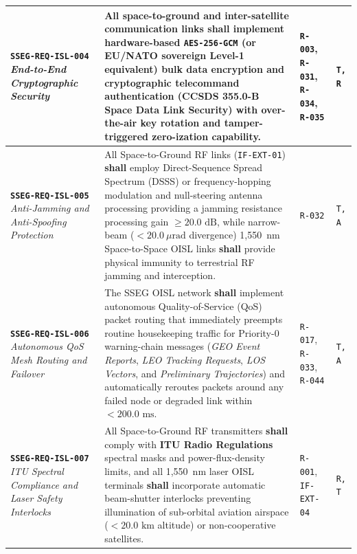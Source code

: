 \documentclass[11pt,a4paper]{article}
\providecommand{\abbr}[1]{#1}
\begin{document}
{\begin{longtable}{|>{\raggedright\arraybackslash}p{}|>{\raggedright\arraybackslash}p{}|>{\raggedright\arraybackslash}p{}|>{\raggedright\arraybackslash}p{}|}
\textbf{\texttt{SSEG-REQ-ISL-004}} \newline \emph{End-to-End} \newline \emph{Cryptographic Security} & All space-to-ground and inter-satellite communication links \textbf{shall} implement hardware-based \texttt{AES-256-GCM} (or EU/NATO sovereign Level-1 equivalent) bulk data encryption and cryptographic telecommand authentication (\textbf{CCSDS 355.0-B} Space Data Link Security) with over-the-air key rotation and tamper-triggered zero-ization capability. & \texttt{R-003}, \texttt{R-031}, \texttt{R-034}, \texttt{R-035} & \texttt{T, R} \\ \hline
\textbf{\texttt{SSEG-REQ-ISL-005}} \newline \emph{Anti-Jamming and Anti-Spoofing Protection} & All Space-to-Ground \abbr{RF} links (\texttt{IF-EXT-01}) \textbf{shall} employ Direct-Sequence Spread Spectrum (\abbr{DSSS}) or frequency-hopping modulation and null-steering antenna processing providing a jamming resistance processing gain $\ge 20.0\text{ dB}$, while narrow-beam ($< 20.0~\mu\mathrm{rad}$ divergence) 1,550~nm Space-to-Space \abbr{OISL} links \textbf{shall} provide physical immunity to terrestrial \abbr{RF} jamming and interception. & \texttt{R-032} & \texttt{T, A} \\ \hline
\textbf{\texttt{SSEG-REQ-ISL-006}} \newline \emph{Autonomous QoS Mesh Routing and Failover} & The \abbr{SSEG} \abbr{OISL} network \textbf{shall} implement autonomous Quality-of-Service (\abbr{QoS}) packet routing that immediately preempts routine housekeeping traffic for Priority-0 warning-chain messages (\emph{GEO Event Reports}, \emph{LEO Tracking Requests}, \emph{LOS Vectors}, and \emph{Preliminary Trajectories}) and automatically reroutes packets around any failed node or degraded link within $< 200.0\text{ ms}$. & \texttt{R-017}, \texttt{R-033}, \texttt{R-044} & \texttt{T, A} \\ \hline
\textbf{\texttt{SSEG-REQ-ISL-007}} \newline \emph{ITU Spectral Compliance and Laser Safety Interlocks} & All Space-to-Ground \abbr{RF} transmitters \textbf{shall} comply with \textbf{ITU Radio Regulations} spectral masks and power-flux-density limits, and all 1,550~nm laser \abbr{OISL} terminals \textbf{shall} incorporate automatic beam-shutter interlocks preventing illumination of sub-orbital aviation airspace ($< 20.0\text{ km}$ altitude) or non-cooperative satellites. & \texttt{R-001}, \newline \texttt{IF-EXT-04} & \texttt{R, T} \\ \hline
\end{longtable}}
\end{document}
